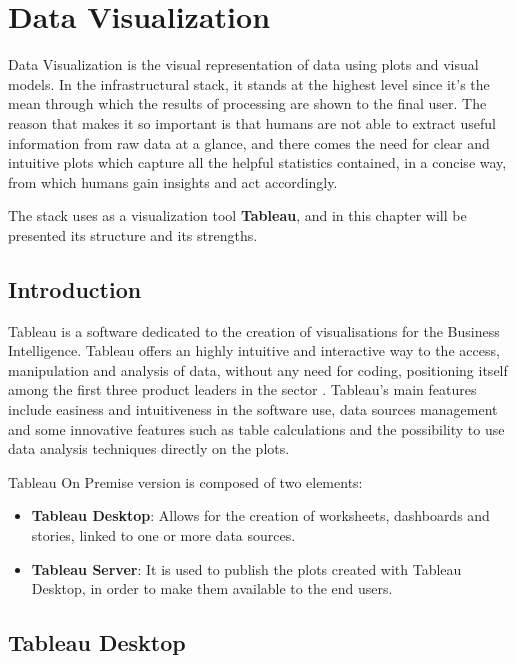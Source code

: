 \chapter{Data Visualization}

Data Visualization is the visual representation of data using plots and visual models. In the infrastructural stack, it stands at the highest level since it's the mean through which the results of processing are shown to the final user. The reason that makes it so important is that humans are not able to extract useful information from raw data at a glance, and there comes the need for clear and intuitive plots which capture all the helpful statistics contained, in a concise way, from which humans gain insights and act accordingly.

The stack uses as a visualization tool \textbf{Tableau}, and in this chapter will be presented its structure and its strengths. 

\section{Introduction}

Tableau is a software dedicated to the creation of visualisations for the Business Intelligence. Tableau offers an highly intuitive and interactive way to the access, manipulation and analysis of data, without any need for coding, positioning itself among the first three product leaders in the sector \cite{gartner_tableau}. Tableau's main features include easiness and intuitiveness in the software use, data sources management and some innovative features such as table calculations and the possibility to use data analysis techniques directly on the plots.

Tableau On Premise version is composed of two elements:

\begin{itemize}
    \item \textbf{Tableau Desktop}: Allows for the creation of worksheets, dashboards and stories, linked to one or more data sources.
    \item \textbf{Tableau Server}: It is used to publish the plots created with Tableau Desktop, in order to make them available to the end users.
\end{itemize}

\section{Tableau Desktop}

